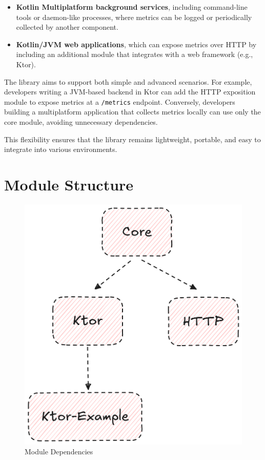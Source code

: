 \begin{itemize}
    \item \textbf{Kotlin Multiplatform background services}, including command-line tools or daemon-like processes, where metrics can be logged or periodically collected by another component.
    \item \textbf{Kotlin/JVM web applications}, which can expose metrics over HTTP by including an additional module that integrates with a web framework (e.g., Ktor).
\end{itemize}

The library aims to support both simple and advanced scenarios.
For example, developers writing a \ac{JVM}-based backend in Ktor can add the HTTP exposition module to expose
metrics at a \texttt{/metrics} endpoint.
Conversely, developers building a multiplatform application that collects metrics locally can use only the core module, avoiding unnecessary dependencies.

This flexibility ensures that the library remains lightweight, portable, and easy to integrate into various environments.


\section{Module Structure}\label{sec:module-structure}

\begin{figure}[H]
    \centering
    \includegraphics[width=0.75\linewidth, keepaspectratio]{./figures/module_dependencies}
    \caption{Module Dependencies}
\end{figure}

